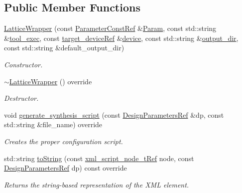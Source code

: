 \subsection*{Public Member Functions}
\begin{DoxyCompactItemize}
\item 
\hyperlink{classLatticeWrapper_a4321338d396a4bdaa08cde45edb5d42a}{Lattice\+Wrapper} (const \hyperlink{Parameter_8hpp_a37841774a6fcb479b597fdf8955eb4ea}{Parameter\+Const\+Ref} \&\hyperlink{classSynthesisTool_a854ef102782ff4d069e1aa6d1a94d64e}{Param}, const std\+::string \&\hyperlink{classSynthesisTool_a78fd58496215c69838de4269204804a5}{tool\+\_\+exec}, const \hyperlink{target__device_8hpp_acedb2b7a617e27e6354a8049fee44eda}{target\+\_\+device\+Ref} \&\hyperlink{classSynthesisTool_a07bf37421c6cff80ba70682ea2b2e3ae}{device}, const std\+::string \&\hyperlink{classSynthesisTool_a285793f6f539ed6f049c375cdb68d607}{output\+\_\+dir}, const std\+::string \&default\+\_\+output\+\_\+dir)
\begin{DoxyCompactList}\small\item\em Constructor. \end{DoxyCompactList}\item 
\hyperlink{classLatticeWrapper_aa618aa25dfd5af58458645f6f1031734}{$\sim$\+Lattice\+Wrapper} () override
\begin{DoxyCompactList}\small\item\em Destructor. \end{DoxyCompactList}\item 
void \hyperlink{classLatticeWrapper_a99d36b0acec057fc76e8dca262920c63}{generate\+\_\+synthesis\+\_\+script} (const \hyperlink{DesignParameters_8hpp_ae36bb1c4c9150d0eeecfe1f96f42d157}{Design\+Parameters\+Ref} \&dp, const std\+::string \&file\+\_\+name) override
\begin{DoxyCompactList}\small\item\em Creates the proper configuration script. \end{DoxyCompactList}\item 
std\+::string \hyperlink{classLatticeWrapper_a0c5cd7306773dc6c6e0250141f78760c}{to\+String} (const \hyperlink{xml__script__command_8hpp_a1fe3d50ade66bc35e41be9b68bbbcd02}{xml\+\_\+script\+\_\+node\+\_\+t\+Ref} node, const \hyperlink{DesignParameters_8hpp_ae36bb1c4c9150d0eeecfe1f96f42d157}{Design\+Parameters\+Ref} dp) const override
\begin{DoxyCompactList}\small\item\em Returns the string-\/based representation of the X\+ML element. \end{DoxyCompactList}\item 

\end{DoxyCompactItemize}

